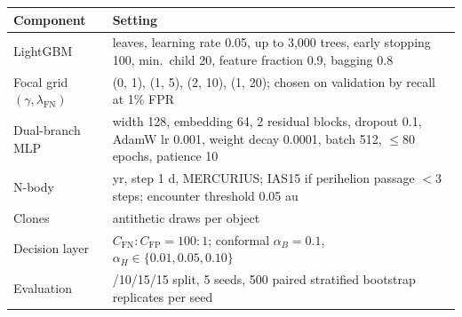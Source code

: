 \begin{tabular}{>{\raggedright\arraybackslash}p{}>{\raggedright\arraybackslash}p{}}
\toprule
Component & Setting\\
\midrule
LightGBM & 31 leaves, learning rate 0.05, up to 3,000 trees, early stopping 100, min.\ child 20, feature fraction 0.9, bagging 0.8\\
Focal grid $(\gamma,\lambda_{\mathrm{FN}})$ & (0, 1), (1, 5), (2, 10), (1, 20); chosen on validation by recall at 1\% FPR\\
Dual-branch MLP & width 128, embedding 64, 2 residual blocks, dropout 0.1, AdamW lr 0.001, weight decay 0.0001, batch 512, $\le$80 epochs, patience 10\\
N-body & 50 yr, step 1 d, MERCURIUS; IAS15 if perihelion passage $<3$ steps; encounter threshold 0.05 au\\
Clones & 32 antithetic draws per object\\
Decision layer & $C_{\mathrm{FN}}:C_{\mathrm{FP}}=100:1$; conformal $\alpha_B=0.1$, $\alpha_H\in\{0.01,0.05,0.10\}$\\
Evaluation & 60/10/15/15 split, 5 seeds, 500 paired stratified bootstrap replicates per seed\\
\bottomrule
\end{tabular}
